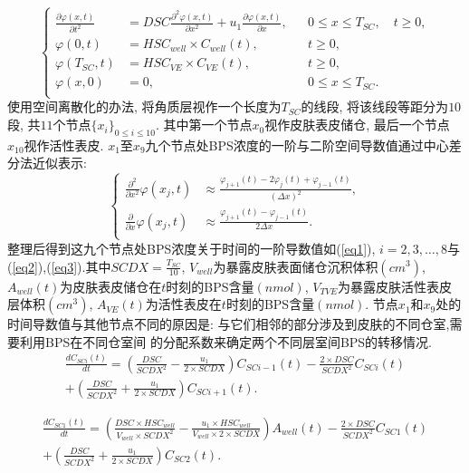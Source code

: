 \documentclass[a4paper,punct=banjiao,twoside]{ctexrep}
\theoremstyle{plain}
\theoremstyle{definition}
\theoremstyle{remark}
\begin{document}
\begin{equation}\label{eq0}
  \left\{\begin{aligned}
    \frac{\partial \varphi(x,t) }{\partial t^2} &= DSC \frac{\partial^2 \varphi(x,t)}{\partial x^2} + u_1 \frac{\partial \varphi(x,t)}{\partial x}, && 0\leq x \leq T_{SC}, \quad t\geq 0,\\
    \varphi(0,t) &= HSC_{well} \times C_{well}(t), &&t\geq 0,\\
    \varphi(T_{SC},t) &= HSC_{VE} \times C_{VE}(t), &&t\geq 0,\\
    \varphi(x,0) &= 0, &&0\leq x \leq T_{SC}.\\
  \end{aligned}\right.
  \end{equation}
\noindent 使用空间离散化的办法, 将角质层视作一个长度为$T_{SC}$的线段, 将该线段等距分为$10$段, 共$11$个节点$\{x_i\}_{0\leq i\leq 10}$. 其中第一个节点$x_0$视作皮肤表皮储仓, 最后一个节点$x_{10}$视作活性表皮.
$x_1$至$x_9$九个节点处BPS浓度的一阶与二阶空间导数值通过中心差分法近似表示: 
\begin{equation}\label{eq1.1}
  \left\{\begin{aligned}
    \frac{\partial^2}{\partial x^2}\varphi(x_j, t) &\approx \frac{\varphi_{j+1}(t) - 2\varphi_j(t) + \varphi_{j-1}(t)}{(\Delta x)^2},\\
    \frac{\partial}{\partial x}\varphi(x_j, t) &\approx \frac{\varphi_{j+1}(t) - \varphi_{j-1}(t)}{2\Delta x}.\\
  \end{aligned}\right.
  \end{equation}
  \noindent 整理后得到这九个节点处BPS浓度关于时间的一阶导数值如(\ref{eq1}), $i=2,3,\dots,8$与(\ref{eq2}),(\ref{eq3}).其中$SCDX = \frac{T_{SC}}{10}$, 
  $V_{well}$为暴露皮肤表面储仓沉积体积$(cm^3)$, $A_{well}(t)$为皮肤表皮储仓在$t$时刻的BPS含量$(nmol)$, $V_{TVE}$为暴露皮肤活性表皮层体积$(cm^3)$, $A_{VE}(t)$为活性表皮在$t$时刻的BPS含量$(nmol)$.
  节点$x_1$和$x_9$处的时间导数值与其他节点不同的原因是: 与它们相邻的部分涉及到皮肤的不同仓室,需要利用BPS在不同仓室间
  的分配系数来确定两个不同层室间BPS的转移情况. 
\begin{multline}\label{eq1}
  \frac{dC_{SCi}(t)}{dt}=\left(\frac{DSC}{SCDX^2} -\frac{u_1}{2 \times  SCDX}\right)C_{SCi-1}(t)-\frac{2 \times DSC}{SCDX^2}  C_{SCi}(t)\\
  +\left(\frac{DSC}{SCDX^2}+\frac{u_1}{2 \times  SCDX}\right)C_{SCi+1}(t).
\end{multline}

\begin{multline}\label{eq2}
  \frac{dC_{SC1}(t)}{dt}=\left(\frac{DSC \times  HSC_{well}}{V_{well}  \times  SCDX^2 }-\frac{u_1  \times  HSC_{well}}{V_{well}  \times  2 \times  SCDX}\right)A_{well}(t)   -\frac{2 \times DSC}{SCDX^2}  C_{SC1}(t)\\
  +\left(\frac{DSC}{SCDX^2}+\frac{u_1}{2 \times  SCDX}\right)C_{SC2}(t).
\end{multline}
\end{document}
